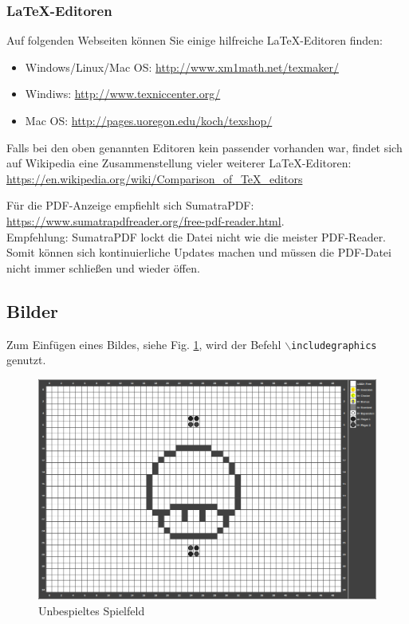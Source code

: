 \documentclass[conference]{IEEEtran}
\begin{document}
\subsubsection{\LaTeX-Editoren}
Auf folgenden Webseiten können Sie einige hilfreiche \LaTeX-Editoren finden:
\begin{itemize}
  \item Windows/Linux/Mac OS: \url{http://www.xm1math.net/texmaker/}
  \item Windiws: \url{http://www.texniccenter.org/}
  \item Mac OS: \url{http://pages.uoregon.edu/koch/texshop/}
\end{itemize}

Falls bei den oben genannten Editoren kein passender vorhanden war, findet sich auf Wikipedia eine Zusammenstellung vieler weiterer \LaTeX-Editoren:\\
\url{https://en.wikipedia.org/wiki/Comparison_of_TeX_editors}

Für die PDF-Anzeige empfiehlt sich SumatraPDF: \\ 
\url{https://www.sumatrapdfreader.org/free-pdf-reader.html}. \\
Empfehlung: SumatraPDF lockt die Datei nicht wie die meister PDF-Reader. Somit können sich kontinuierliche Updates machen und müssen die PDF-Datei nicht immer schließen und wieder öffen.



\subsection{Bilder}
Zum Einfügen eines Bildes, siehe Fig. \ref{fig:reversi01}, wird  der Befehl \texttt{$\backslash$includegraphics} genutzt.

\begin{figure}[htbp]
	\centering
	\includegraphics[width=0.7\linewidth]{figures/gamefield01.png}
	\caption[Spielfeld 01]{Unbespieltes Spielfeld}
	\label{fig:reversi01}
\end{figure}
\end{document}
